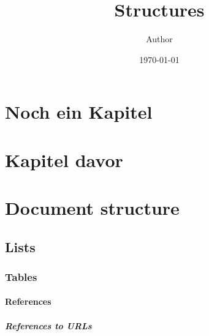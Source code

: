 \documentclass[12pt,oneside]{report}
\title{Structures}
\author{Author}
\date{\today}
\begin{document}
\maketitle
\tableofcontents

\chapter{Noch ein Kapitel}
\blindtext[5]
\chapter{Kapitel davor}
\chapter{Document structure}
\blindtext
\section{Lists}
\subsection{Tables}
\blindtext
\subsubsection{References}
\blindtext 
\paragraph{References to URLs}
\blindtext
\end{document}
